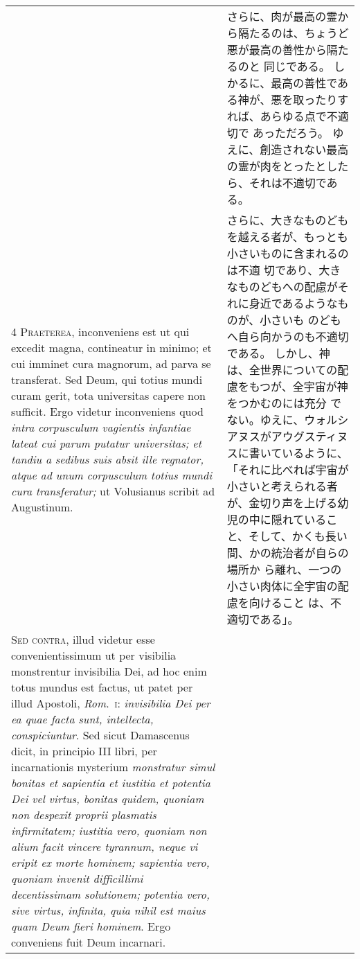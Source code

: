 \documentclass[10pt]{jsarticle} %
\begin{document}
\begin{longtable}{p{21em}p{21em}}
&

さらに、肉が最高の霊から隔たるのは、ちょうど悪が最高の善性から隔たるのと
 同じである。
しかるに、最高の善性である神が、悪を取ったりすれば、あらゆる点で不適切で
 あっただろう。
ゆえに、創造されない最高の霊が肉をとったとしたら、それは不適切である。


\\

4 {\scshape Praeterea}, inconveniens est ut qui excedit magna, contineatur in
minimo; et cui imminet
 cura magnorum, ad parva se transferat. Sed Deum,
qui totius mundi curam gerit, tota universitas capere non sufficit. Ergo
videtur inconveniens quod {\itshape intra corpusculum vagientis
 infantiae lateat
cui parum putatur universitas; et tandiu a sedibus suis absit ille
regnator, atque ad unum corpusculum totius mundi cura transferatur;} ut
Volusianus scribit ad Augustinum.

&

さらに、大きなものどもを越える者が、もっとも小さいものに含まれるのは不適
切であり、大きなものどもへの配慮がそれに身近であるようなものが、小さいも
のどもへ自ら向かうのも不適切である。
しかし、神は、全世界についての配慮をもつが、全宇宙が神をつかむのには充分
 でない。ゆえに、ウォルシアヌスがアウグスティヌスに書いているように、「それに比べれば宇宙が小さいと考えられる者が、金切り声を上げる幼
 児の中に隠れていること、そして、かくも長い間、かの統治者が自らの場所か
 ら離れ、一つの小さい肉体に全宇宙の配慮を向けること
 は、不適切である」。


\\


{\scshape Sed contra}, illud videtur esse convenientissimum ut per visibilia
monstrentur invisibilia Dei, ad hoc enim totus mundus est factus, ut
patet per illud Apostoli, {\itshape Rom}.~{\scshape i}: {\itshape invisibilia Dei per ea quae facta
sunt, intellecta, conspiciuntur}. Sed sicut Damascenus dicit, in
principio III libri, per incarnationis mysterium {\itshape monstratur simul
bonitas et sapientia et iustitia et potentia Dei vel virtus, bonitas
quidem, quoniam non despexit
 proprii plasmatis
 infirmitatem; iustitia
vero, quoniam non alium facit vincere tyrannum, neque vi
 eripit ex morte
hominem; sapientia vero, quoniam invenit difficillimi decentissimam
solutionem; potentia vero, sive virtus, infinita, quia nihil est maius
quam Deum fieri hominem}. Ergo conveniens fuit Deum incarnari.


\end{longtable}
\end{document}
